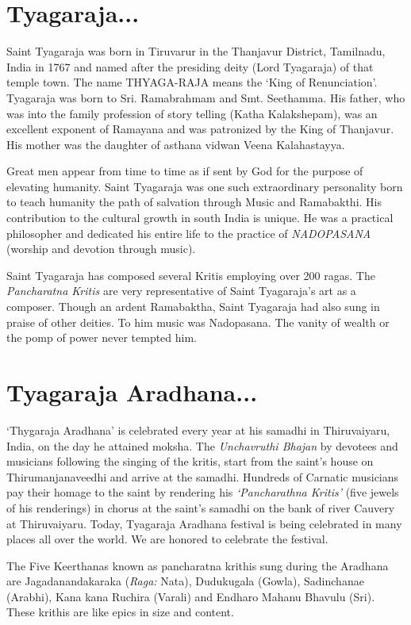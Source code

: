 \documentclass{article}
\begin{document}
\begin{framed}

{
\section*{Tyagaraja...}
Saint Tyagaraja was born in Tiruvarur in the Thanjavur 
District, Tamilnadu, India in 1767 and named after the presiding deity 
(Lord Tyagaraja) of that temple town. The name THYAGA-RAJA 
means the `King of Renunciation'. Tyagaraja was born to Sri. Ramabrahmam 
and Smt. Seethamma. His father, who was into the family
profession of story telling (Katha Kalakshepam), was an excellent exponent of 
Ramayana and was patronized by the King
of Thanjavur. His mother was the daughter of asthana vidwan Veena Kalahastayya.

Great men appear from time to time as if sent by God 
for the purpose of elevating humanity. Saint Tyagaraja 
was one such extraordinary personality born to teach 
humanity the path of salvation through Music and Ramabakthi. 
His contribution to the cultural growth in south India is 
unique. He was a practical philosopher and dedicated his 
entire life to the practice of {\em NADOPASANA} (worship 
and devotion through music).

Saint Tyagaraja has composed several Kritis 
employing over 200 ragas. The {\em Pancharatna Kritis} are 
very representative of Saint Tyagaraja's art as a composer. 
Though an ardent Ramabaktha, 
Saint Tyagaraja had also sung in praise of other deities. 
To him music was Nadopasana. The vanity of
wealth or the pomp of power never tempted him.
}


\section*{Tyagaraja Aradhana...}
`Thygaraja Aradhana' is celebrated every year 
at his samadhi in Thiruvaiyaru, India, on the day he attained moksha. 
The {\em Unchavruthi Bhajan} by devotees and musicians 
following the singing of the kritis, start from 
the saint's house on Thirumanjanaveedhi and arrive 
at the samadhi.
Hundreds of Carnatic musicians pay their homage to 
the saint by rendering his {\em {\large `Pancharathna Kritis'}} 
(five jewels of his renderings) in chorus at the 
saint's samadhi on the bank of river
Cauvery at Thiruvaiyaru. Today, Tyagaraja Aradhana 
festival is being celebrated in many places all over the world.
We are honored to celebrate the festival. 

The Five Keerthanas known as  pancharatna krithis  
sung during the Aradhana are Jagadanandakaraka ({\em Raga:} Nata), 
Dudukugala (Gowla), Sadinchanae (Arabhi), 
Kana kana Ruchira (Varali) and Endharo Mahanu Bhavulu (Sri).
These krithis are like epics in size and content.


\end{framed}
\end{document}
